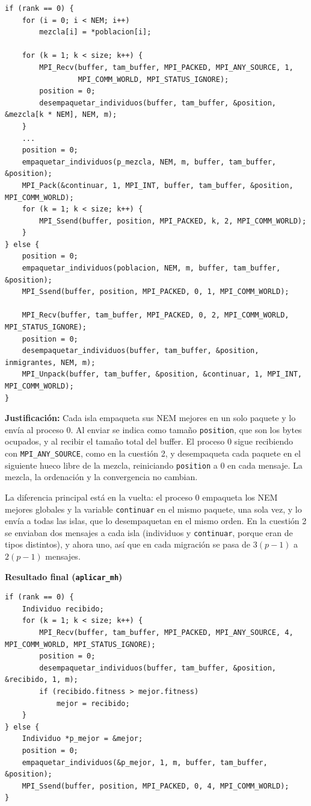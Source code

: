 \documentclass[12pt]{article}
\begin{document}
\begin{enumerate}
\begin{lstlisting}[style=EstiloC]
if (rank == 0) {
	for (i = 0; i < NEM; i++)
		mezcla[i] = *poblacion[i];

	for (k = 1; k < size; k++) {
		MPI_Recv(buffer, tam_buffer, MPI_PACKED, MPI_ANY_SOURCE, 1,
				 MPI_COMM_WORLD, MPI_STATUS_IGNORE);
		position = 0;
		desempaquetar_individuos(buffer, tam_buffer, &position, &mezcla[k * NEM], NEM, m);
	}
	...
	position = 0;
	empaquetar_individuos(p_mezcla, NEM, m, buffer, tam_buffer, &position);
	MPI_Pack(&continuar, 1, MPI_INT, buffer, tam_buffer, &position, MPI_COMM_WORLD);
	for (k = 1; k < size; k++) {
		MPI_Ssend(buffer, position, MPI_PACKED, k, 2, MPI_COMM_WORLD);
	}
} else {
	position = 0;
	empaquetar_individuos(poblacion, NEM, m, buffer, tam_buffer, &position);
	MPI_Ssend(buffer, position, MPI_PACKED, 0, 1, MPI_COMM_WORLD);

	MPI_Recv(buffer, tam_buffer, MPI_PACKED, 0, 2, MPI_COMM_WORLD, MPI_STATUS_IGNORE);
	position = 0;
	desempaquetar_individuos(buffer, tam_buffer, &position, inmigrantes, NEM, m);
	MPI_Unpack(buffer, tam_buffer, &position, &continuar, 1, MPI_INT, MPI_COMM_WORLD);
}
\end{lstlisting}

\textbf{Justificación:} Cada isla empaqueta sus NEM mejores en un solo paquete y lo envía al proceso 0. Al enviar se indica como tamaño \texttt{position}, que son los bytes ocupados, y al recibir el tamaño total del buffer. El proceso 0 sigue recibiendo con \texttt{MPI\_ANY\_SOURCE}, como en la cuestión 2, y desempaqueta cada paquete en el siguiente hueco libre de la mezcla, reiniciando \texttt{position} a 0 en cada mensaje. La mezcla, la ordenación y la convergencia no cambian.

La diferencia principal está en la vuelta: el proceso 0 empaqueta los NEM mejores globales y la variable \texttt{continuar} en el mismo paquete, una sola vez, y lo envía a todas las islas, que lo desempaquetan en el mismo orden. En la cuestión 2 se enviaban dos mensajes a cada isla (individuos y \texttt{continuar}, porque eran de tipos distintos), y ahora uno, así que en cada migración se pasa de $3(p-1)$ a $2(p-1)$ mensajes.

\vspace{0.5cm}


\medskip
\noindent\textbf{Resultado final (\texttt{aplicar\_mh})}\par
\smallskip

\begin{lstlisting}[style=EstiloC]
if (rank == 0) {
	Individuo recibido;
	for (k = 1; k < size; k++) {
		MPI_Recv(buffer, tam_buffer, MPI_PACKED, MPI_ANY_SOURCE, 4, MPI_COMM_WORLD, MPI_STATUS_IGNORE);
		position = 0;
		desempaquetar_individuos(buffer, tam_buffer, &position, &recibido, 1, m);
		if (recibido.fitness > mejor.fitness)
			mejor = recibido;
	}
} else {
	Individuo *p_mejor = &mejor;
	position = 0;
	empaquetar_individuos(&p_mejor, 1, m, buffer, tam_buffer, &position);
	MPI_Ssend(buffer, position, MPI_PACKED, 0, 4, MPI_COMM_WORLD);
}
\end{lstlisting}


\end{enumerate}
\end{document}
